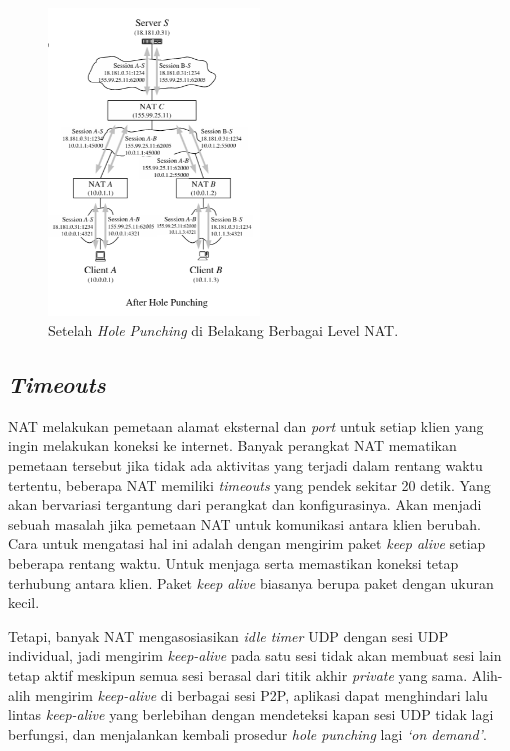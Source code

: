 \begin{figure}[H]
  \centering{}
  \includegraphics[width=0.5\textwidth]{gambar/hole_punching_behind_different_level_nat_2}
  \caption{Setelah \emph{Hole Punching} di Belakang Berbagai Level NAT.}
\end{figure}

\subsection{\emph{Timeouts}}

NAT melakukan pemetaan alamat eksternal dan \emph{port} untuk setiap klien yang ingin melakukan koneksi ke internet. Banyak perangkat NAT mematikan pemetaan tersebut jika tidak ada aktivitas yang terjadi dalam rentang waktu tertentu, beberapa NAT memiliki \emph{timeouts} yang pendek sekitar 20 detik. Yang akan bervariasi tergantung dari perangkat dan konfigurasinya. Akan menjadi sebuah masalah jika pemetaan NAT untuk komunikasi antara klien berubah. Cara untuk mengatasi hal ini adalah dengan mengirim paket \emph{keep alive} setiap beberapa rentang waktu. Untuk menjaga serta memastikan koneksi tetap terhubung antara klien. Paket \emph{keep alive} biasanya berupa paket dengan ukuran kecil.

Tetapi, banyak NAT mengasosiasikan \emph{idle timer} UDP dengan sesi UDP individual, jadi mengirim \emph{keep-alive} pada satu sesi tidak akan membuat sesi lain tetap aktif meskipun semua sesi berasal dari titik akhir \emph{private} yang sama. Alih-alih mengirim \emph{keep-alive} di berbagai sesi P2P, aplikasi dapat menghindari lalu lintas \emph{keep-alive} yang berlebihan dengan mendeteksi kapan sesi UDP tidak lagi berfungsi, dan menjalankan kembali prosedur \emph{hole punching} lagi \emph{`on demand'}.

